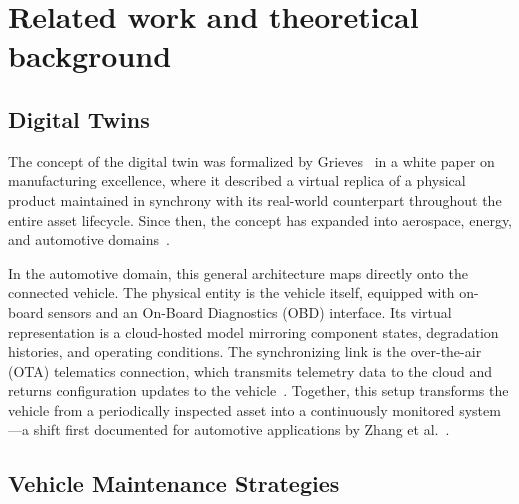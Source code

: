 \documentclass[conference,a4paper]{IEEEtran}
\begin{document}
\section{Related work and theoretical background}\label{sec:related}

\subsection{Digital Twins}

The concept of the digital twin was formalized by Grieves~\cite{grieves2014} in a white paper on manufacturing excellence, where it described a virtual replica of a physical product maintained in synchrony with its real-world counterpart throughout the entire asset lifecycle. Since then, the concept has expanded into aerospace, energy, and automotive domains~\cite{wang2023review,wise_go_2000}.

In the automotive domain, this general architecture maps directly onto the connected vehicle. The physical entity is the vehicle itself, equipped with on-board sensors and an On-Board Diagnostics (OBD) interface. Its virtual representation is a cloud-hosted model mirroring component states, degradation histories, and operating conditions. The synchronizing link is the over-the-air (OTA) telematics connection, which transmits telemetry data to the cloud and returns configuration updates to the vehicle~\cite{lopes2025vehicledt,coppola2016connected,zhang2009connected}. Together, this setup transforms the vehicle from a periodically inspected asset into a continuously monitored system---a shift first documented for automotive applications by Zhang et al.~\cite{zhang2009connected}.




\subsection{Vehicle Maintenance Strategies}
\end{document}
